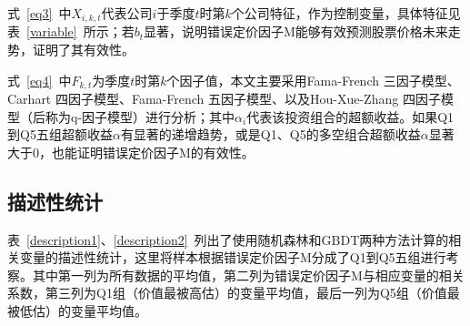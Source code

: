 式~\ref{eq3}~中$X_{i, k, t}$代表公司$i$于季度$t$时第$k$个公司特征，作为控制变量，具体特征见表~\ref{variable}~所示；若$b_{t}$显著，说明错误定价因子M能够有效预测股票价格未来走势，证明了其有效性。

式~\ref{eq4}~中$F_{k,t}$为季度$t$时第$k$个因子值，本文主要采用Fama-French 三因子模型、Carhart 四因子模型、Fama-French 五因子模型、以及Hou-Xue-Zhang 四因子模型（后称为q-因子模型）进行分析；其中$\alpha_{i}$代表该投资组合的超额收益。如果Q1到Q5五组超额收益$\alpha$有显著的递增趋势，或是Q1、Q5的多空组合超额收益$\alpha$显著大于0，也能证明错误定价因子M的有效性。


\subsection{描述性统计}
表~\ref{description1}、\ref{description2}~列出了使用随机森林和GBDT两种方法计算的相关变量的描述性统计，这里将样本根据错误定价因子M分成了Q1到Q5五组进行考察。其中第一列为所有数据的平均值，第二列为错误定价因子M与相应变量的相关系数，第三列为Q1组（价值最被高估）的变量平均值，最后一列为Q5组（价值最被低估）的变量平均值。

